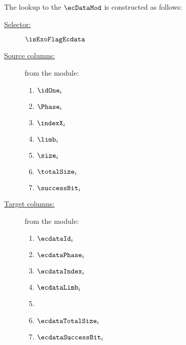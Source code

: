 The lookup to the $\ecDataMod$ is constructed as follows:
\begin{description}
	\item[\underline{Selector:}] $\isExoFlagEcdata$
	\item[\underline{Source columns:}] from the \mmioMod{} module:
		\begin{multicols}{3}
			\begin{enumerate}
				\item $\idOne_{i}$
				\item $\Phase_{i}$
				\item $\indexX_{i}$
				\item $\limb_{i}$
				\item $\size_{i}$
				\item $\totalSize_{i}$
				\item $\successBit_{i}$
			\end{enumerate}
		\end{multicols}
	\item[\underline{Target columns:}] from the \ecDataMod{} module: 
			\begin{multicols}{3}
				\begin{enumerate}
					\item $\ecdataId_{i}$
					\item $\ecdataPhase_{i}$
					\item $\ecdataIndex_{i}$
					\item $\ecdataLimb_{i}$
					\item {}
					\item $\ecdataTotalSize_{i}$
					\item $\ecdataSuccessBit_{i}$
				\end{enumerate}
			\end{multicols}
\end{description}
